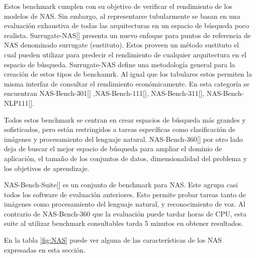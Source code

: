 Estos benchmark cumplen con su objetivo de verificar el rendimiento de los modelos de NAS. Sin embargo, al representarse tubularmente se basan en una 
evaluación exhaustiva de todas las arquitecturas en un espacio de búsqueda poco realista. Surrugate-NAS[\cite{66}] presenta un nuevo enfoque para puntos de 
referencia de NAS denominado surrugate (sustituto). Estos proveen un método sustituto el cual pueden utilizar para predecir el rendimiento de cualquier arquitectura 
en el espacio de búsqueda. Surrugate-NAS define una metodología general para la creación de estos tipos de benchamrk. Al igual que los tabulares estos permiten la 
misma interfaz de consultar el rendimiento económicamente. En esta categoría se encuentran NAS-Bench-301[\cite{57}] ,NAS-Bench-111[\cite{58}], 
NAS-Bench-311[\cite{58}], NAS-Bench-NLP111[\cite{58}].

Todos estos benchmark se centran en crear espacios de búsqueda más grandes y sofisticados, pero están restringidos a tareas específicas como clasificación de imágenes 
y procesamiento del lenguaje natural. NAS-Bench-360[\cite{51}] por otro lado deja de buscar el mejor espacio de búsqueda para ampliar el dominio de aplicación, el 
tamaño de los conjuntos de datos, dimensionalidad del problema y los objetivos de aprendizaje.

NAS-Bench-Suite[\cite{58}] es un conjunto de benchmark para NAS. Este agrupa casi todos los software de evaluación anteriores. Esto permite probar tareas tanto de 
imágenes como procesamiento del lenguaje natural, y reconocimiento de voz. Al contrario de NAS-Bench-360 que la evaluación puede tardar horas de CPU, esta suite al 
utilizar benchmark consultables tarda 5 minutos en obtener resultados.

En la tabla \ref{fig:NAS} puede ver alguna de las características de los NAS expresadas en esta sección.





      
